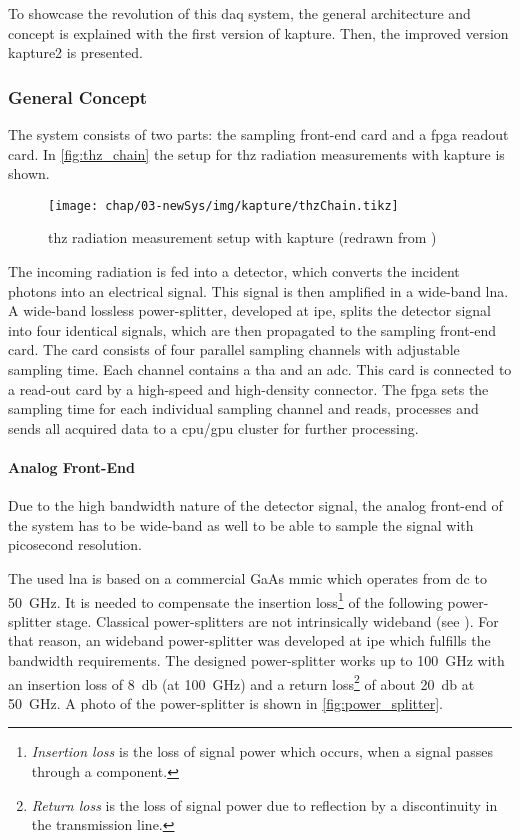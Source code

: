 To showcase the revolution of this \gls{daq} system, the general architecture and concept is explained with the first version of \gls{kapture}.
Then, the improved version \gls{kapture2} is presented.

\subsubsection*{General Concept}
The system consists of two parts: the sampling front-end card and a \gls{fpga} readout card. In \autoref{fig:thz_chain} the setup for \gls{thz} radiation measurements with \gls{kapture} is shown. 

\begin{figure}[H]
	\centering
	\texttt{[image: chap/03-newSys/img/kapture/thzChain.tikz]}
	\caption[THz measurement with KAPTURE]{\gls{thz} radiation measurement setup with \gls{kapture} (redrawn from \cite{caselle2014})}
	\label{fig:thz_chain}
\end{figure}
The incoming radiation is fed into a detector, which converts the incident photons into an electrical signal. 
This signal is then amplified in a wide-band \gls{lna}. 
A wide-band lossless power-splitter, developed at \gls{ipe}, splits the detector signal into four identical signals, which are then propagated to the sampling front-end card. 
The card consists of four parallel sampling channels with adjustable sampling time. 
Each channel contains a \gls{tha} and an \gls{adc}. 
This card is connected to a read-out card by a high-speed and high-density connector. 
The \gls{fpga} sets the sampling time for each individual sampling channel and reads, processes and sends all acquired data to a \gls{cpu}/\gls{gpu} cluster for further processing. \cite{caselle2014}



\paragraph{Analog Front-End}
Due to the high bandwidth nature of the detector signal, the analog front-end of the system has to be wide-band as well to be able to sample the signal with picosecond resolution. 

The used \gls{lna} is based on a commercial GaAs \gls{mmic} which operates from \gls{dc} to \SI{50}{\giga \hertz}. 
It is needed to compensate the insertion loss\footnote{\textit{Insertion loss} is the loss of signal power which occurs, when a signal passes through a component.} of the following power-splitter stage. 
Classical power-splitters are not intrinsically wideband (see \cite{caselle2014}). 
For that reason, an wideband power-splitter was developed at \gls{ipe} which fulfills the bandwidth requirements. 
The designed power-splitter works up to \SI{100}{\giga \hertz} with an insertion loss of \SI{8}{\decibel} (at \SI{100}{\GHz}) and a return loss\footnote{\textit{Return loss} is the loss of signal power due to reflection by a discontinuity in the transmission line.} of about \SI{20}{\decibel} at \SI{50}{\giga \hertz}. \cite{caselle2014}
A photo of the power-splitter is shown in \autoref{fig:power_splitter}.


